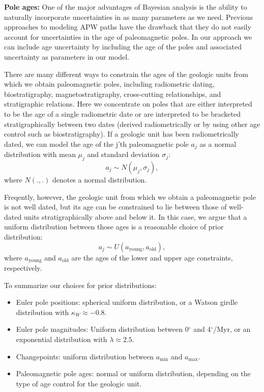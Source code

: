 \documentclass[preprint,12pt,authoryear]{elsarticle}
\begin{document}
\textbf{Pole ages:}
One of the major advantages of Bayesian analysis is the ability to naturally incorporate
uncertainties in as many parameters as we need. Previous approaches to
modeling APW paths have the drawback that they do not easily account for uncertainties in
the age of paleomagnetic poles. In our approach we can include age uncertainty
by including the age of the poles and associated uncertainty as parameters in our model.

There are many different ways to constrain the ages of the geologic units from
which we obtain paleomagnetic poles, including radiometric dating, biostratigraphy,
magnetostratigraphy, cross-cutting relationships, and stratigraphic relations.
Here we concentrate on poles that are either interpreted to be the age of a single radiometric
date or are interpreted to be bracketed stratigraphically between two dates
(derived radiometrically or by using other age control such as biostratigraphy).
If a geologic unit has been radiometrically dated, we can model the age of
the j'th paleomagnetic pole $a_j$ as a normal distribution with mean $\mu_j$ and standard deviation $\sigma_j$:
\begin{equation}
a_j \sim N(\mu_j, \sigma_j),
\end{equation}
where $N(.,.)$ denotes a normal distribution.

Freqently, however, the geologic unit from which we obtain a paleomagnetic pole
is not well dated, but its age can be constrained to lie between those
of well-dated units stratigraphically above and below it. In this case,
we argue that a uniform distribution between those ages is a reasonable choice
of prior distribution:
\begin{equation}
a_j \sim U(a_\mathrm{young}, a_\mathrm{old}),
\end{equation}
where $a_\mathrm{young}$ and $a_\mathrm{old}$ are the ages of the lower and upper
age constraints, respectively.

To summarize our choices for prior distributions:
\begin{itemize}
\item Euler pole positions: spherical uniform distribution, or a Watson girdle distribution with $\kappa_W \approx -0.8$.
\item Euler pole magnitudes: Uniform distribution between 0$^\circ$ and 4$^\circ$/Myr, or an exponential distribution with $\lambda \approx 2.5$.
\item Changepoints: uniform distribution between $a_\mathrm{min}$ and $a_\mathrm{max}$.
\item Paleomagnetic pole ages: normal or uniform distribution, depending on the type of age control for the geologic unit.
\end{itemize}
\end{document}

